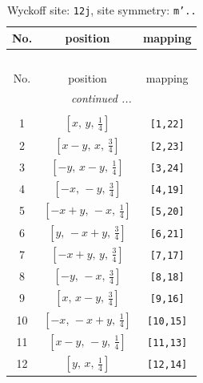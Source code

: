 \documentclass[fleqn,8pt]{jsarticle}
\begin{document}
\begin{longtable}{ccc}
\caption{Wyckoff site: {\tt 12j}, site symmetry: {\tt m'..}}
 \\
 \hline \hline
No. & position & mapping \\ \hline \endfirsthead

\multicolumn{2}{l}{\tablename\ \thetable{}} \\
 \hline \hline
No. & position & mapping \\ \hline \endhead

 \hline \hline
\multicolumn{2}{r}{\footnotesize\it continued ...} \\ \endfoot

 \hline \hline
\multicolumn{2}{r}{} \\ \endlastfoot

1 & $\left[ x,\, y,\, \frac{1}{4} \right]$ & {\tt [1,22]} \\ \hline
2 & $\left[ x - y,\, x,\, \frac{3}{4} \right]$ & {\tt [2,23]} \\ \hline
3 & $\left[ - y,\, x - y,\, \frac{1}{4} \right]$ & {\tt [3,24]} \\ \hline
4 & $\left[ - x,\, - y,\, \frac{3}{4} \right]$ & {\tt [4,19]} \\ \hline
5 & $\left[ - x + y,\, - x,\, \frac{1}{4} \right]$ & {\tt [5,20]} \\ \hline
6 & $\left[ y,\, - x + y,\, \frac{3}{4} \right]$ & {\tt [6,21]} \\ \hline
7 & $\left[ - x + y,\, y,\, \frac{3}{4} \right]$ & {\tt [7,17]} \\ \hline
8 & $\left[ - y,\, - x,\, \frac{3}{4} \right]$ & {\tt [8,18]} \\ \hline
9 & $\left[ x,\, x - y,\, \frac{3}{4} \right]$ & {\tt [9,16]} \\ \hline
10 & $\left[ - x,\, - x + y,\, \frac{1}{4} \right]$ & {\tt [10,15]} \\ \hline
11 & $\left[ x - y,\, - y,\, \frac{1}{4} \right]$ & {\tt [11,13]} \\ \hline
12 & $\left[ y,\, x,\, \frac{1}{4} \right]$ & {\tt [12,14]} \\
\end{longtable}
\renewcommand{\arraystretch}{1.2}
\end{document}
